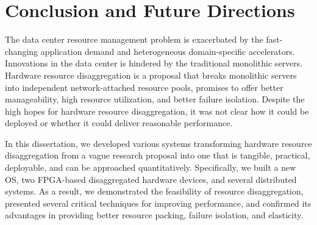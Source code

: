 \chapter{Conclusion and Future Directions}

The data center resource management problem is exacerbated by
the fast-changing application demand and heterogeneous domain-specific accelerators.
Innovations in the data center is hindered by the traditional monolithic servers.
Hardware resource disaggregation is a proposal that breaks monolithic servers
into independent network-attached resource pools,
promises to offer better manageability, high resource utilization, and better failure isolation.
Despite the high hopes for hardware resource disaggregation,
it was not clear how it could be deployed or whether it could deliver reasonable performance.

In this dissertation, we developed various systems transforming hardware resource disaggregation
from a vague research proposal into one that is tangible, practical, deployable, and can be approached quantitatively.
Specifically, we built a new OS, two FPGA-based disaggregated hardware devices, and several distributed systems.
As a result, we demonstrated the feasibility of resource disaggregation, 
presented several critical techniques for improving performance,
and confirmed its advantages in providing better resource packing, failure isolation, and elasticity.


